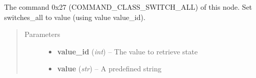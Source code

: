 \documentclass[letterpaper,10pt,english]{sphinxmanual}
\begin{document}
\begin{fulllineitems}

\begin{fulllineitems}
\label{command:openzwave.command.ZWaveNodeSwitch.set_switch_all}
The command 0x27 (COMMAND\_CLASS\_SWITCH\_ALL) of this node.
Set switches\_all to value (using value value\_id).
\begin{quote}\begin{description}
\item[{Parameters}] \leavevmode\begin{itemize}
\item {} 
\textbf{value\_id} (\emph{int}) -- The value to retrieve state

\item {} 
\textbf{value} (\emph{str}) -- A predefined string

\end{itemize}

\end{description}\end{quote}

\end{fulllineitems}


\end{fulllineitems}

\end{document}
